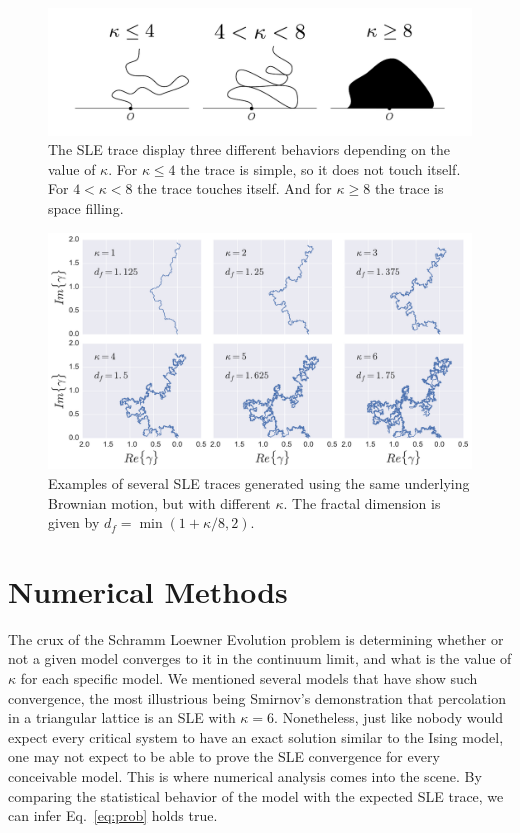 \begin{figure}
\begin{center}
    \includegraphics[width=\textwidth]{chapters/ch4-sle/figs/kappa}
\end{center}
\caption{The SLE trace display three different behaviors depending on the value
    of $\kappa$. For $\kappa\leq4$ the trace is simple, so it does not touch
    itself. For $4<\kappa<8$ the trace touches itself. And for $\kappa\geq8$
    the trace is space filling.}
\label{fig:kappa}
\end{figure}

\begin{figure}
\begin{center}
    \includegraphics[scale=0.5]{chapters/ch4-sle/figs/slefracdim}
\end{center}
\caption{Examples of several SLE traces generated using the same underlying
    Brownian motion, but with different $\kappa$. The fractal dimension is
    given by $d_f=\min(1+\kappa/8, 2)$.}
\label{fig:slefracdim}
\end{figure}


\section{Numerical Methods}
\label{sec:num}

The crux of the Schramm Loewner Evolution problem is determining whether or not
a given model converges to it in the continuum limit, and what is the value of
$\kappa$ for each specific model. We mentioned several models that have show
such convergence, the most illustrious being Smirnov's demonstration that
percolation in a triangular lattice is an SLE with $\kappa=6$. Nonetheless,
just like nobody would expect every critical system to have an exact solution
similar to the Ising model, one may not expect to be able to prove the SLE
convergence for every conceivable model. This is where numerical analysis comes
into the scene. By comparing the statistical behavior of the model with the
expected SLE trace, we can infer Eq.~\ref{eq:prob} holds true.

